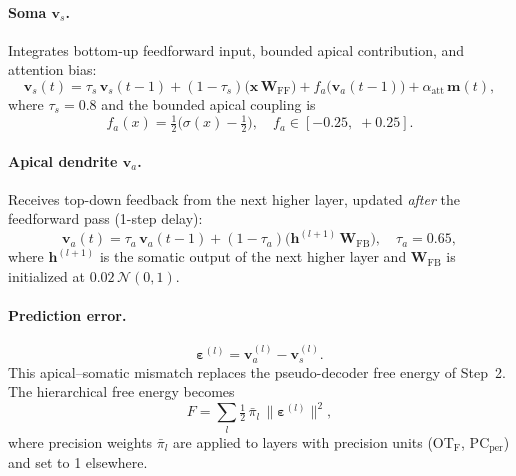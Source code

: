 \documentclass[11pt,a4paper]{article}
\begin{document}
\paragraph{Soma $\mathbf{v}_s$.}  Integrates bottom-up feedforward input,
bounded apical contribution, and attention bias:
\begin{equation}\label{eq:soma}
  \mathbf{v}_s(t) = \tau_s\,\mathbf{v}_s(t{-}1)
    + (1 - \tau_s)\bigl(\mathbf{x}\,\mathbf{W}_\text{FF}\bigr)
    + f_a\!\bigl(\mathbf{v}_a(t{-}1)\bigr)
    + \alpha_\text{att}\,\mathbf{m}(t),
\end{equation}
where $\tau_s = 0.8$ and the bounded apical coupling is
\begin{equation}\label{eq:apical_coupling}
  f_a(x) = \tfrac{1}{2}\bigl(\sigma(x) - \tfrac{1}{2}\bigr),
  \quad f_a \in [-0.25,\;+0.25].
\end{equation}

\paragraph{Apical dendrite $\mathbf{v}_a$.}  Receives top-down feedback
from the next higher layer, updated \emph{after} the feedforward pass
(1-step delay):
\begin{equation}\label{eq:apical}
  \mathbf{v}_a(t) = \tau_a\,\mathbf{v}_a(t{-}1)
    + (1 - \tau_a)\bigl(\mathbf{h}^{(l+1)}\,\mathbf{W}_\text{FB}\bigr),
  \quad \tau_a = 0.65,
\end{equation}
where $\mathbf{h}^{(l+1)}$ is the somatic output of the next higher
layer and $\mathbf{W}_\text{FB}$ is initialized at $0.02\,\mathcal{N}(0,1)$.

\paragraph{Prediction error.}
\begin{equation}\label{eq:pred_error}
  \boldsymbol{\varepsilon}^{(l)} = \mathbf{v}_a^{(l)} - \mathbf{v}_s^{(l)}.
\end{equation}
This apical--somatic mismatch replaces the pseudo-decoder free energy of
Step~2.  The hierarchical free energy becomes
\begin{equation}\label{eq:hier_free_energy}
  F = \sum_{l} \tfrac{1}{2}\,\bar{\pi}_l\,
      \bigl\|\boldsymbol{\varepsilon}^{(l)}\bigr\|^2,
\end{equation}
where precision weights $\bar{\pi}_l$ are applied to layers with
precision units (OT$_\text{F}$, PC$_\text{per}$) and set to 1 elsewhere.
\end{document}
